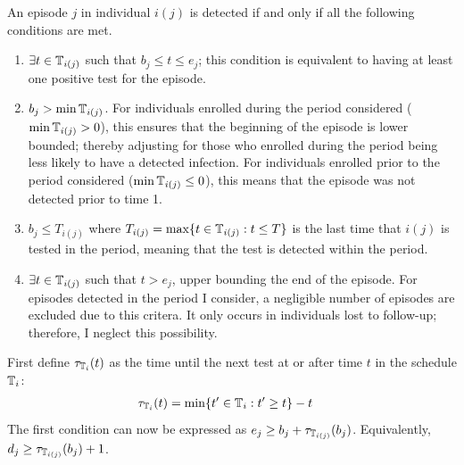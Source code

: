 \documentclass[thesis.tex]{subfiles}
\begin{document}
An episode $j$ in individual $i(j)$ is detected if and only if all the following conditions are met.
\begin{enumerate}
    \item $\exists t \in \mathbb{T}_{i(j)}$ such that $b_j \leq t \leq e_j$; this condition is equivalent to having at least one positive test for the episode.
    \item $b_j > \min \mathbb{T}_{i(j)}$.
      For individuals enrolled during the period considered ($\min \mathbb{T}_{i(j)} > 0$), this ensures that the beginning of the episode is lower bounded; thereby adjusting for those who enrolled during the period being less likely to have a detected infection.
      For individuals enrolled prior to the period considered ($\min \mathbb{T}_{i(j)} \leq 0$), this means that the episode was not detected prior to time 1.
    \item $b_j \leq T_{i(j)}$ where $T_{i(j)} = \max \{ t \in \mathbb{T}_{i(j)} : t \leq T \}$ is the last time that $i(j)$ is tested in the period, meaning that the test is detected within the period.
    \item $\exists t \in \mathbb{T}_{i(j)}$ such that $t > e_j$, upper bounding the end of the episode.
      For episodes detected in the period I consider, a negligible number of episodes are excluded due to this critera.
      It only occurs in individuals lost to follow-up; therefore, I neglect this possibility.
\end{enumerate}

First define $\tau_{\mathbb{T}_i}(t)$ as the time until the next test at or after time $t$ in the schedule $\mathbb{T}_i$:
\begin{align}
\tau_{\mathbb{T}_i}(t) &= \min \{ t' \in \mathbb{T}_i : t' \geq t \} - t
\label{perf-test:eq:tau-def}
\end{align}
The first condition can now be expressed as $e_j \geq b_j + \tau_{\mathbb{T}_{i(j)}}(b_j)$.
Equivalently, $d_j \geq \tau_{\mathbb{T}_{i(j)}}(b_j) + 1$.
\end{document}
